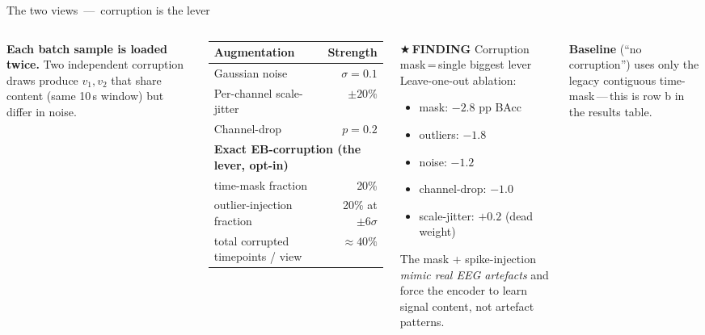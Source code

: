 \documentclass[aspectratio=169,11pt]{beamer}
\newcommand{\findingtag}{\textcolor{tplgold}{\scriptsize\sffamily\bfseries$\bigstar$\,FINDING}\xspace}
\newcommand{\sectionheader}[1]{\renewcommand{\insertsection}{#1}}
\begin{document}
\sectionheader{DATA \,\textperiodcentered\, 2/2}
\begin{frame}{The two views \,---\, corruption is the lever}
\begin{columns}[T,onlytextwidth]
\textbf{Each batch sample is loaded twice.} Two independent corruption draws
produce $v_1,v_2$ that share content (same 10\,s window) but differ in noise.

\vspace{0.3em}
\centering\small
\begin{tabular}{@{}lr@{}}
\toprule
\textbf{Augmentation} & \textbf{Strength} \\
\midrule
Gaussian noise & $\sigma=0.1$ \\
Per-channel scale-jitter & $\pm 20\%$ \\
Channel-drop & $p = 0.2$ \\
\midrule
\multicolumn{2}{l}{\textbf{Exact EB-corruption (the lever, opt-in)}} \\
\quad time-mask fraction & 20\% \\
\quad outlier-injection fraction & 20\% at $\pm 6\sigma$ \\
\quad total corrupted timepoints / view & $\approx 40\%$ \\
\bottomrule
\end{tabular}

\begin{findingbox}\findingtag Corruption mask\,=\,single biggest lever\\[0.3em]
\small Leave-one-out ablation:
\begin{itemize}\setlength\itemsep{0pt}
\item mask: $-2.8$ pp BAcc
\item outliers: $-1.8$
\item noise: $-1.2$
\item channel-drop: $-1.0$
\item scale-jitter: $+0.2$ (dead weight)
\end{itemize}
The mask + spike-injection \emph{mimic real EEG artefacts} and force the
encoder to learn signal content, not artefact patterns.
\end{findingbox}

\vspace{0.5em}
{\small \textbf{Baseline} (``no corruption'') uses only the legacy contiguous
time-mask\,---\,this is row b in the results table.}
\end{columns}
\end{frame}
\end{document}
